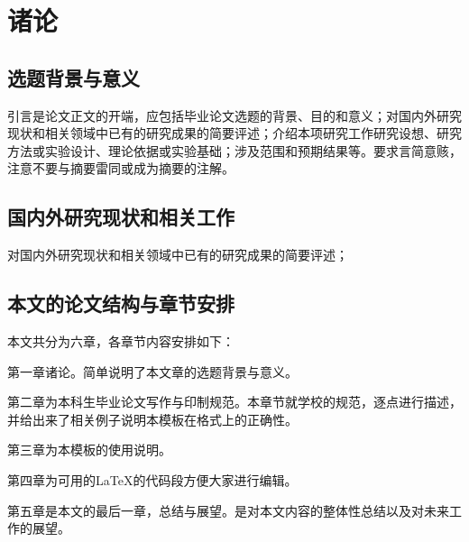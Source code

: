 
\chapter{诸论}
\label{cha:introduction}
\section{选题背景与意义}
\label{sec:background}
引言是论文正文的开端，应包括毕业论文选题的背景、目的和意义；对国内外研究现状和相关领域中已有的研究成果的简要评述；介绍本项研究工作研究设想、研究方法或实验设计、理论依据或实验基础；涉及范围和预期结果等。要求言简意赅，注意不要与摘要雷同或成为摘要的注解。

\section{国内外研究现状和相关工作}
\label{sec:related_work}
对国内外研究现状和相关领域中已有的研究成果的简要评述；
\section{本文的论文结构与章节安排}

\label{sec:arrangement}

本文共分为六章，各章节内容安排如下：

第一章诸论。简单说明了本文章的选题背景与意义。

第二章为本科生毕业论文写作与印制规范。本章节就学校的规范，逐点进行描述，并给出来了相关例子说明本模板在格式上的正确性。

第三章为本模板的使用说明。

第四章为可用的\LaTeX 的代码段方便大家进行编辑。

第五章是本文的最后一章，总结与展望。是对本文内容的整体性总结以及对未来工作的展望。

